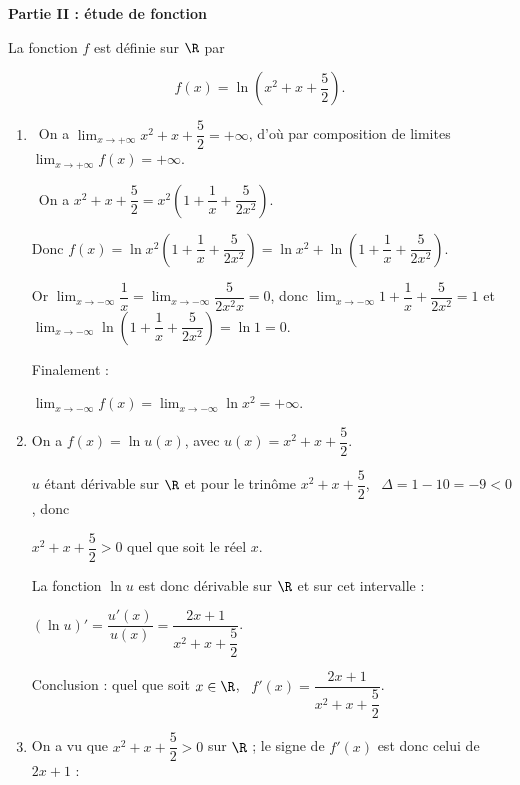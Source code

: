 \bigskip

\textbf{Partie II : étude de fonction}

\medskip

La fonction $f$ est définie sur $\R$ par 

\[f(x) = \ln \left(x^2 + x + \dfrac{5}{2}\right).\]

\medskip

\begin{enumerate}
\item %
\starredbullet~On a $\displaystyle\lim_{x \to + \infty} x^2 + x + \dfrac{5}{2} = + \infty$, d'où par composition de limites $\displaystyle\lim_{x \to + \infty} f(x) = + \infty$.

\starredbullet~On a $x^2 + x + \dfrac{5}{2} = x^2\left(1 + \dfrac{1}{x} + \dfrac{5}{2x^2}\right)$.

Donc $f(x) = \ln x^2\left(1 + \dfrac{1}{x} + \dfrac{5}{2x^2}\right) = \ln x^2 + \ln \left(1 + \dfrac{1}{x} + \dfrac{5}{2x^2}\right)$.

Or $\displaystyle\lim_{x \to - \infty}\dfrac{1}{x} = \displaystyle\lim_{x \to - \infty}\dfrac{5}{2x^2x} = 0$, donc 
$\displaystyle\lim_{x \to - \infty}1 + \dfrac{1}{x} + \dfrac{5}{2x^2} = 1$ et $\displaystyle\lim_{x \to - \infty}\ln \left(1 + \dfrac{1}{x} + \dfrac{5}{2x^2}\right) = \ln 1 = 0$.

Finalement :

$\displaystyle\lim_{x \to - \infty}f(x) = \displaystyle\lim_{x \to - \infty}\ln x^2 = + \infty$.
\item %
On a $f(x) = \ln u(x)$, avec $u(x) = x^2 + x + \dfrac{5}{2}$.

$u$ étant dérivable sur $\R$ et pour le trinôme $x^2 + x + \dfrac{5}{2}$, \, $\Delta = 1 - 10 = - 9 < 0$, donc 

$x^2 + x + \dfrac{5}{2} > 0$ quel que soit le réel $x$.

La fonction $\ln u$ est donc dérivable sur $\R$ et sur cet intervalle :

$\left(\ln u \right)' = \dfrac{u'(x)}{u(x)} = \dfrac{2x + 1}{x^2 + x + \dfrac{5}{2}}$.

Conclusion : quel que soit $x \in \R$, \, $f'(x) = \dfrac{2x + 1}{x^2 + x + \dfrac{5}{2}}$.
\item %
On a vu que $x^2 + x + \dfrac{5}{2} > 0$ sur $\R$ ; le signe de $f'(x)$ est donc celui de $2x + 1$ :


\end{enumerate}
